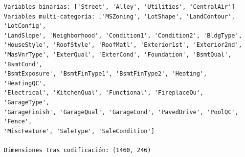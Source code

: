 \documentclass[11pt]{article}
\begin{document}
    \begin{Verbatim}[commandchars=\\\{\}]
Variables binarias: ['Street', 'Alley', 'Utilities', 'CentralAir']
Variables multi-categoría: ['MSZoning', 'LotShape', 'LandContour', 'LotConfig',
'LandSlope', 'Neighborhood', 'Condition1', 'Condition2', 'BldgType',
'HouseStyle', 'RoofStyle', 'RoofMatl', 'Exterior1st', 'Exterior2nd',
'MasVnrType', 'ExterQual', 'ExterCond', 'Foundation', 'BsmtQual', 'BsmtCond',
'BsmtExposure', 'BsmtFinType1', 'BsmtFinType2', 'Heating', 'HeatingQC',
'Electrical', 'KitchenQual', 'Functional', 'FireplaceQu', 'GarageType',
'GarageFinish', 'GarageQual', 'GarageCond', 'PavedDrive', 'PoolQC', 'Fence',
'MiscFeature', 'SaleType', 'SaleCondition']

Dimensiones tras codificación: (1460, 246)
    \end{Verbatim}
\end{document}
